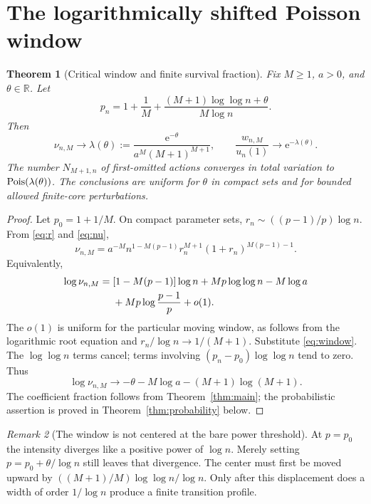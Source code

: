 \documentclass[11pt,a4paper]{article}
\numberwithin{equation}{section}
\newtheorem{theorem}{Theorem}[section]
\theoremstyle{definition}
\theoremstyle{remark}
\newtheorem{remark}[theorem]{Remark}
\newcommand{\R}{\mathbb R}\newcommand{\N}{\mathbb N}\newcommand{\C}{\mathbb C}
\newcommand{\ee}{\mathrm e}\newcommand{\dd}{\mathrm d}
\begin{document}
\section{The logarithmically shifted Poisson window}
\label{sec:window}
\begin{theorem}[Critical window and finite survival fraction]
\label{thm:window}
Fix $M\ge1$, $a>0$, and $\theta\in\R$. Let
\begin{equation}
 p_n=1+\frac1M+
 \frac{(M+1)\log\log n+\theta}{M\log n}.
 \label{eq:window}
\end{equation}
Then
\begin{equation}
 \nu_{n,M}\longrightarrow
 \lambda(\theta):=\frac{\ee^{-\theta}}{a^M(M+1)^{M+1}},
 \qquad
 \frac{w_{n,M}}{u_n(1)}\longrightarrow\ee^{-\lambda(\theta)}.
 \label{eq:window-limit}
\end{equation}
The number $N_{M+1,n}$ of first-omitted actions converges in total variation
to $\operatorname{Pois}(\lambda(\theta))$. The conclusions are uniform for $\theta$ in
compact sets and for bounded allowed finite-core perturbations.
\end{theorem}
\begin{proof}
Let $p_0=1+1/M$. On compact parameter sets,
$r_n\sim((p-1)/p)\log n$. From \eqref{eq:r} and \eqref{eq:nu},
\begin{equation}
 \nu_{n,M}
 =a^{-M}n^{1-M(p-1)}r_n^{M+1}
                  (1+r_n)^{M(p-1)-1}.
 \label{eq:nu-power}
\end{equation}
Equivalently,
\begin{align}
 \log\nu_{n,M}
 ={}&[1-M(p-1)]\log n+Mp\log\log n-M\log a\notag\\
 &+Mp\log\frac{p-1}{p}+o(1).
 \label{eq:nu-log}
\end{align}
The $o(1)$ is uniform for the particular moving window, as follows from
the logarithmic root equation and $r_n/\log n\to1/(M+1)$.
Substitute \eqref{eq:window}. The $\log\log n$ terms cancel; terms
involving $(p_n-p_0)\log\log n$ tend to zero. Thus
\[
 \log\nu_{n,M}\to
 -\theta-M\log a-(M+1)\log(M+1).
\]
The coefficient fraction follows from Theorem~\ref{thm:main}; the
probabilistic assertion is proved in Theorem~\ref{thm:probability} below.
\end{proof}

\begin{remark}[The window is not centered at the bare power threshold]
At $p=p_0$ the intensity diverges like a positive power of $\log n$.
Merely setting $p=p_0+\theta/\log n$ still leaves that divergence.
The center must first be moved upward by
$((M+1)/M)\log\log n/\log n$. Only after this displacement does a width
of order $1/\log n$ produce a finite transition profile.
\end{remark}
\end{document}
